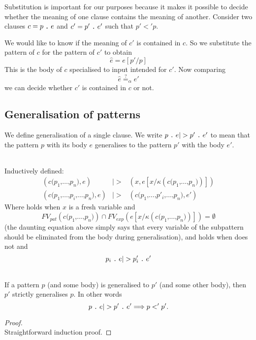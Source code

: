 Substitution is important for our purposes because it makes it possible to
decide whether the meaning of one clause contains the meaning of another.
Consider two clauses $c = p\mathrel{\texttt{.}}e$ and $c' = p'\mathrel{\texttt{.}}e'$ such that
$p' <' p$.

We would like to know if the meaning of $c'$ is contained in $c$. So we
substitute the pattern of $c$ for the pattern of $c'$ to obtain
\[
\hat{e} = e[p'/p]
\]
This is the body of $c$ specialised to input intended for $c'$. Now comparing
\[
\hat{e} \stackrel{?}{=}_\alpha e'
\]
we can decide whether $c'$ is contained in $c$ or not.

\subsection{Generalisation of patterns}
We define generalisation of a single clause. We write $\clause{p}{e} |>
\clause{p'}{e'}$ to mean that the pattern $p$ with its body $e$ generalises to
the pattern $p'$ with the body $e'$.

\begin{definition}\
  \label{def:gener-patt}\\
  Inductively defined:
  \begin{eqnarray}
    (c \texttt{(} p_1 \texttt{,} \ldots \texttt{,} p_n \texttt{)} , e) &|>& (x , e[x
    / \kappa (c \texttt{(} p_1 \texttt{,} \ldots \texttt{,} p_n \texttt{)} )]) 
    \label{eq:single-gen-1}\\
    (c \texttt{(} p_1 \texttt{,} \ldots \texttt{,} p_i \texttt{,} \ldots
    \texttt{,} p_n \texttt{)}, e) &|>&
    (c \texttt{(} p_1 \texttt{,} \ldots \texttt{,} p'_i \texttt{,} \ldots
    \texttt{,} p_n \texttt{)}, e') \label{eq:single-gen-2}
  \end{eqnarray}
  Where  holds when $x$ is a fresh variable and
  \[
  FV_{pat}(c\texttt{(}p_1\texttt{,}\ldots\texttt{,}p_n\texttt{)}) \cap FV_{exp}(e[x/\kappa
  (c\texttt{(}p_1\texttt{,}\ldots\texttt{,}p_n\texttt{)})]) = \emptyset
  \]
  (the daunting equation above simply says that every variable of the subpattern
  should be eliminated from the body during generalisation), and
  \fref[plain]{eq:single-gen-2} holds when  does not and
  \[
  \clause{p_i}{e} |> \clause{p'_i}{e'}
  \]
\end{definition}

\begin{lemma}\
  \label{lem:single-gen-imp-gen}\\
  If a pattern $p$ (and some body) is generalised to $p'$ (and some other
  body), then $p'$ strictly generalises $p$. In other words
  \[
  \clause{p}{e} |> \clause{p'}{e'} ==> p <' p'.
  \]
\end{lemma}
\begin{proof}\ \\
  Straightforward induction proof.
\end{proof}

